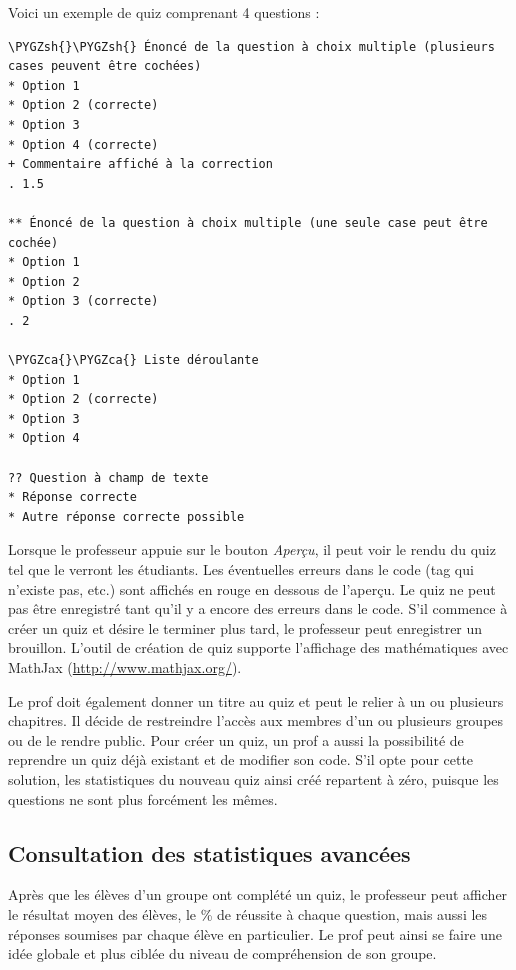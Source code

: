 \documentclass[letterpaper,10pt,french]{sphinxmanual}
\def\PYGZca{\char`\^}
\def\PYGZsh{\char`\#}
\begin{document}
Voici un exemple de quiz comprenant 4 questions :

\begin{Verbatim}[commandchars=\\\{\}]
\PYGZsh{}\PYGZsh{} Énoncé de la question à choix multiple (plusieurs cases peuvent être cochées)
* Option 1
* Option 2 (correcte)
* Option 3
* Option 4 (correcte)
+ Commentaire affiché à la correction
. 1.5

** Énoncé de la question à choix multiple (une seule case peut être cochée)
* Option 1
* Option 2
* Option 3 (correcte)
. 2

\PYGZca{}\PYGZca{} Liste déroulante
* Option 1
* Option 2 (correcte)
* Option 3
* Option 4

?? Question à champ de texte
* Réponse correcte
* Autre réponse correcte possible
\end{Verbatim}

Lorsque le professeur appuie sur le bouton \emph{Aperçu}, il peut voir le rendu du quiz tel que le verront les étudiants. Les éventuelles erreurs dans le code (tag qui n'existe pas, etc.) sont affichés en rouge en dessous de l'aperçu. Le quiz ne peut pas être enregistré tant qu'il y a encore des erreurs dans le code. S'il commence à créer un quiz et désire le terminer plus tard, le professeur peut enregistrer un brouillon. L'outil de création de quiz supporte l'affichage des mathématiques avec MathJax (\href{http://www.mathjax.org/}{http://www.mathjax.org/}).

Le prof doit également donner un titre au quiz et peut le relier à un ou plusieurs chapitres. Il décide de restreindre l'accès aux membres d'un ou plusieurs groupes ou de le rendre public. Pour créer un quiz, un prof a aussi la possibilité de reprendre un quiz déjà existant et de modifier son code. S'il opte pour cette solution, les statistiques du nouveau quiz ainsi créé repartent à zéro, puisque les questions ne sont plus forcément les mêmes.


\subsection{Consultation des statistiques avancées}
\label{functionalities:consultation-des-statistiques-avancees}
Après que les élèves d'un groupe ont complété un quiz, le professeur peut afficher le résultat moyen des élèves, le \% de réussite à chaque question, mais aussi les réponses soumises par chaque élève en particulier. Le prof peut ainsi se faire une idée globale et plus ciblée du niveau de compréhension de son groupe.
\end{document}
